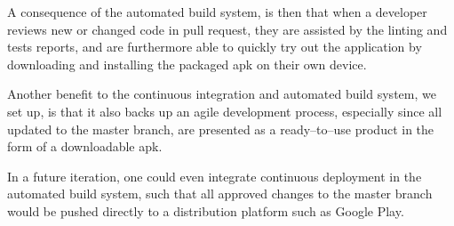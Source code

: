 A consequence of the automated build system, is then that when a developer reviews new or changed code in pull request, they are assisted by the linting and tests reports, and are furthermore able to quickly try out the application by downloading and installing the packaged apk on their own device.

\bigskip
Another benefit to the continuous integration and automated build system, we set up, is that it also backs up an agile development process, especially since all updated to the master branch, are presented as a ready--to--use product in the form of a downloadable apk.

In a future iteration, one could even integrate continuous deployment in the automated build system, such that all approved changes to the master branch would be pushed directly to a distribution platform such as Google Play.

